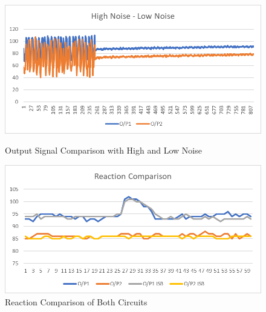 	\begin{figure}
		\begin{center}
		\includegraphics[width=1\textwidth]{Pics/1}
		\caption{Output Signal Comparison with High and Low Noise}
		\vspace{2cm}
		\includegraphics[width=1\textwidth]{Pics/2}
		\caption{Reaction Comparison of Both Circuits}
		\medskip
	\end{center}
	\end{figure}
		\newpage
